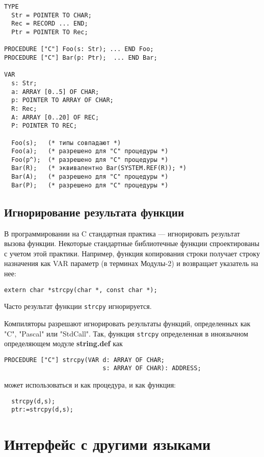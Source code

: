 \Example
\begin{verbatim}
TYPE
  Str = POINTER TO CHAR;
  Rec = RECORD ... END;
  Ptr = POINTER TO Rec;

PROCEDURE ["C"] Foo(s: Str); ... END Foo;
PROCEDURE ["C"] Bar(p: Ptr);  ... END Bar;

VAR
  s: Str;
  a: ARRAY [0..5] OF CHAR;
  p: POINTER TO ARRAY OF CHAR;
  R: Rec;
  A: ARRAY [0..20] OF REC;
  P: POINTER TO REC;

  Foo(s);   (* типы совпадают *)
  Foo(a);   (* разрешено для "C" процедуры *)
  Foo(p^);  (* разрешено для "C" процедуры *)
  Bar(R);   (* эквивалентно Bar(SYSTEM.REF(R)); *)
  Bar(A);   (* разрешено для "C" процедуры *)
  Bar(P);   (* разрешено для "C" процедуры *)
\end{verbatim}

\subsection{Игнорирование результата функции}

В программировании на C стандартная практика --- игнорировать результат
вызова функции. Некоторые стандартные библиотечные функции спроектированы
с учетом этой практики. Например, функция копирования строки получает
строку назначения как VAR параметр (в терминах Модулы-2) и возвращает
указатель на нее:
\begin{verbatim}
extern char *strcpy(char *, const char *);
\end{verbatim}
Часто результат функции {\tt strcpy} игнорируется.

Компиляторы \xds{} разрешают игнорировать результаты функций, определенных
как "C", "Pascal" или "StdCall".
Так, функция {\tt strcpy}
определенная в иноязычном определяющем модуле {\bf string.def} как
\begin{verbatim}
PROCEDURE ["C"] strcpy(VAR d: ARRAY OF CHAR;
                           s: ARRAY OF CHAR): ADDRESS;
\end{verbatim}
может использоваться и как процедура, и как функция:
\begin{verbatim}
  strcpy(d,s);
  ptr:=strcpy(d,s);
\end{verbatim}


\ifcomment %

\section{Интерфейс с другими языками}

